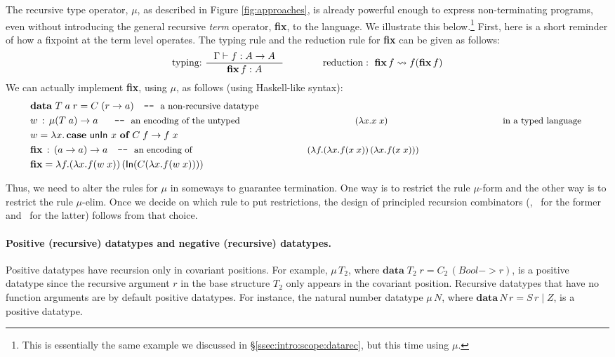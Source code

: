 The recursive type operator, $\mu$, as described in Figure \ref{fig:approaches},
is already powerful enough to express non-terminating programs, even without
introducing the general recursive {\em term} operator, \textbf{fix},
to the language. We illustrate this below.\footnote{This is essentially
        the same example we discussed in \S\ref{ssec:intro:scope:datarec},
        but this time using $\mu$.}
First, here is a short reminder of how a fixpoint at the term level operates.
The typing rule and the reduction rule for \textbf{fix} can be given as follows:
\[ \text{typing:}~ \inference{\Gamma |- f : A -> A}{\textbf{fix}\,f : A}
 \qquad\qquad
   \text{reduction}:~ \textbf{fix}\,f \rightsquigarrow f(\textbf{fix}\,f)
\]
We can actually implement \textbf{fix}, using $\mu$, as follows
(using Haskell-like syntax):
\begin{align*}
& \textbf{data}~T\;a\;r = C\;(r -> a) \quad
          \texttt{-}\texttt{-}~\text{\small a non-recursive datatype} \\
& w \,:\, \mu(T\;a) -> a ~~ \quad
          \texttt{-}\texttt{-}~\text{\small an encoding of the untyped
                                     $(\lambda x.x\;x)$
                                     in a typed language}~ \\
& w = \lambda x . \,\textbf{case}~\mathsf{unIn}~x~\textbf{of}~C\;f -> f\;x \\
& \textbf{fix} \,:\, (a -> a) -> a \quad
          \texttt{-}\texttt{-}~\text{\small an encoding of 
                                     $(\lambda f.(\lambda x.f(x\;x))\,
                                                 (\lambda x.f(x\;x)))$} \\
& \textbf{fix} = \lambda f. (\lambda x. f (w\;x))\,(\mathsf{In}(C(\lambda x. f (w\;x))))
\end{align*}

Thus, we need to alter the rules for $\mu$ in someways to guarantee termination.
One way is to restrict the rule {\small $\mu$-form} and
the other way is to restrict the rule {\small $\mu$-elim}.
Once we decide on which rule to put restrictions, the design of
principled recursion combinators (\eg, \It\ for the former
and \MIt\ for the latter) follows from that choice.

\paragraph{Positive (recursive) datatypes and negative (recursive) datatypes.}
Positive datatypes have recursion only in covariant positions.
For example, $\mu\,T_2$, where $\textbf{data}\;T_2 \; r = C_2\,(Bool -> r)$,
is a positive datatype since the recursive argument $r$ in
the base structure $T_2$ only appears in the covariant position.
Recursive datatypes that have no function arguments are by default
positive datatypes. For instance, the natural number datatype $\mu\,N$,
where $\textbf{data}\,N\,r=S\,r \mid Z$, is a positive datatype.

